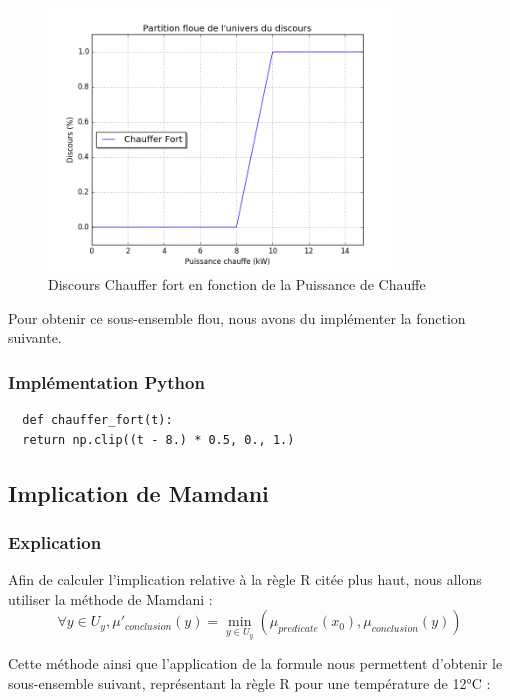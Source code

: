 \documentclass[a4paper]{article}
\begin{document}
\begin{figure}[h]
  \begin{center}
    \includegraphics[width=350px]{chauffer_fort.png}
  \end{center}
  \caption{Discours Chauffer fort en fonction de la Puissance de Chauffe}
\end{figure}

Pour obtenir ce sous-ensemble flou, nous avons du implémenter la fonction suivante.

\subsubsection{Implémentation Python}
\begin{lstlisting}
  def chauffer_fort(t):
  return np.clip((t - 8.) * 0.5, 0., 1.)
\end{lstlisting}

\clearpage
\subsection{Implication de Mamdani}

\subsubsection{Explication}
Afin de calculer l'implication relative à la règle R citée plus haut, nous allons utiliser la méthode de Mamdani :
\begin{equation}
  \forall y \in U_y, \mu'_{conclusion}(y) = \min_{y \in U_y} (\mu_{predicate}(x_0), \mu_{conclusion}(y))
\end{equation}

Cette méthode ainsi que l'application de la formule nous permettent d'obtenir le sous-ensemble suivant, représentant la règle R pour une température de 12°C :
\end{document}
